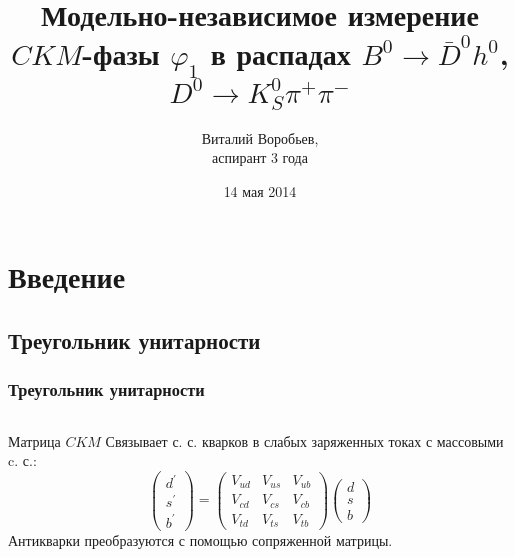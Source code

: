 \documentclass[10 pt,compress,mathserif]{beamer}
\newcommand{\dkspp}{\ensuremath{D^0\to K_S^0\pi^+\pi^-}\xspace}
\newcommand{\bdh}{\ensuremath{B^0\to \bar D^0h^0}\xspace}
\begin{document}
\title{Модельно-независимое измерение $CKM$-фазы $\varphi_1$ в распадах \bdh, \dkspp}
\author{Виталий Воробьев,\\
        аспирант 3 года}
\date{14 мая 2014}
\frame{\titlepage}

\section{Введение}
\subsection{Треугольник унитарности}
\begin{frame}
 \frametitle{Треугольник унитарности}
 \begin{small}
 \begin{columns}
 \begin{column}{0.6\textwidth}
  \begin{block}{Матрица $CKM$}
  Связывает с. с. кварков в слабых заряженных токах с массовыми c. с.:
  \begin{equation*}
   \left( \begin{array}{c}
          d^{\prime} \\
          s^{\prime} \\
          b^{\prime} \end{array}
   \right) = 
   \left( \begin{array}{ccc}
          V_{ud} & V_{us} & V_{ub} \\
          V_{cd} & V_{cs} & V_{cb} \\
          V_{td} & V_{ts} & V_{tb}
          \end{array}
   \right)
   \left( \begin{array}{c}
          d \\
          s \\
          b \end{array}
   \right)
  \end{equation*}
  Антикварки преобразуются с помощью сопряженной матрицы.
  

\end{block}
\end{column}
\end{columns}
\end{small}
\end{frame}
\end{document}
